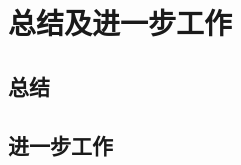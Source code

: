 \chapter{总结及进一步工作}
\label{cha:conclusion}

\section{总结}
\label{sec:conclude}

\section{进一步工作}
\label{sec:futurework}
